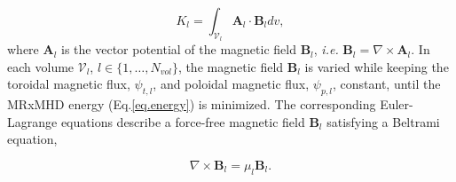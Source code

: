 \documentclass[my_thesis.tex]{subfiles}
\begin{document}
\begin{equation}
	K_l = \int_{\mathcal{V}_l} \mathbf{A}_l\cdot \mathbf{B}_l dv,
\end{equation}
where $\mathbf{A}_l$ is the vector potential of the magnetic field  $\mathbf{B}_l$, \textit{i.e.} $\mathbf{B}_l=\nabla\times\mathbf{A}_l$. In each volume $\mathcal{V}_l$, $l\in\{1,\ldots,N_{vol}\}$, the magnetic field $\mathbf{B}_l$ is varied while keeping the toroidal magnetic flux, $\psi_{t,l}$, and poloidal magnetic flux, $\psi_{p,l}$, constant, until the \ac{MRxMHD} energy (Eq.\ref{eq.energy}) is minimized. The corresponding Euler-Lagrange equations \citep{Hudson2012} describe a force-free magnetic field $\mathbf{B}_l$ satisfying a Beltrami equation,

\begin{equation}
	\nabla\times\mathbf{B}_l = \mu_l\mathbf{B}_l.
\end{equation}
\end{document}
